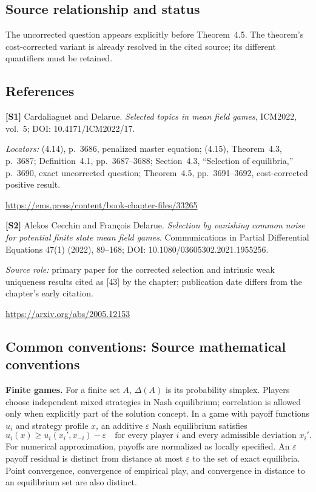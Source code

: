 \documentclass[11pt,a4paper]{article}
\begin{document}
\subsection*{Source relationship and status}
The uncorrected question appears explicitly before Theorem~4.5. The theorem's cost-corrected variant is already resolved in the cited source; its different quantifiers must be retained.
\subsection*{References}
\begingroup\footnotesize\raggedright
{\footnotesize\raggedright
\textbf{[S1]} Cardaliaguet and Delarue. \emph{Selected topics in mean field games}, ICM2022, vol.~5; DOI: 10.4171/ICM2022/17.\par
\textit{Locators:} (4.14), p.~3686, penalized master equation; (4.15), Theorem~4.3, p.~3687; Definition~4.1, pp.~3687--3688; Section~4.3, ``Selection of equilibria,'' p.~3690, exact uncorrected question; Theorem~4.5, pp.~3691--3692, cost-corrected positive result.\par
\url{https://ems.press/content/book-chapter-files/33265}\par\smallskip
\textbf{[S2]} Alekos Cecchin and Fran\c{c}ois Delarue. \emph{Selection by vanishing common noise for potential finite state mean field games}. Communications in Partial Differential Equations 47(1) (2022), 89--168; DOI: 10.1080/03605302.2021.1955256.\par
\textit{Source role:} primary paper for the corrected selection and intrinsic weak uniqueness results cited as [43] by the chapter; publication date differs from the chapter's early citation.\par
\url{https://arxiv.org/abs/2005.12153}\par}
\par\endgroup

\subsection*{Common conventions: Source mathematical conventions}

\textbf{Finite games.} For a finite set $A$, $\Delta(A)$ is its probability
simplex. Players choose independent mixed strategies in Nash equilibrium;
correlation is allowed only when explicitly part of the solution concept.
In a game with payoff functions $u_i$ and strategy profile $x$, an additive
$\varepsilon$ Nash equilibrium satisfies
\[
 u_i(x)\geq u_i(x_i',x_{-i})-\varepsilon
 \quad\text{for every player $i$ and every admissible deviation $x_i'$}.
\]
For numerical approximation, payoffs are normalized as locally specified.
An $\varepsilon$ payoff residual is distinct from distance at most
$\varepsilon$ to the set of exact equilibria. Point convergence, convergence
of empirical play, and convergence in distance to an equilibrium set are
also distinct.
\end{document}
